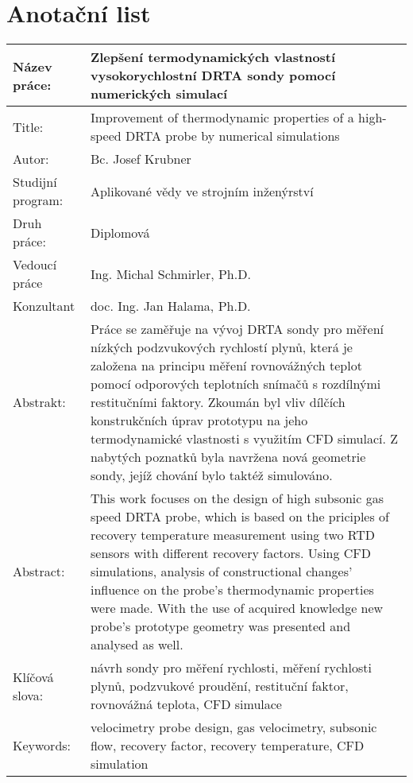 \thispagestyle{empty}
\section*{Anotační list}
\def\arraystretch{2}%
\begin{table}[ht!]
    \centering
    \begin{tabular}{p{}|p{}}
    Název práce: & Zlepšení termodynamických vlastností vysokorychlostní DRTA sondy pomocí numerických simulací \\ \hline
    Title: & Improvement of thermodynamic properties of a high-speed DRTA probe by numerical simulations \\ \hline
    Autor: & Bc. Josef Krubner \\ \hline
    Studijní program: & Aplikované vědy ve strojním inženýrství \\ \hline
    Druh práce: & Diplomová \\ \hline
    Vedoucí práce & Ing. Michal Schmirler, Ph.D. \\ \hline
    Konzultant & doc. Ing. Jan Halama, Ph.D. \\ \hline
    Abstrakt: & Práce se zaměřuje na vývoj DRTA sondy pro měření nízkých podzvukových rychlostí plynů, která je založena na principu měření rovnovážných teplot pomocí odporových teplotních snímačů s rozdílnými restitučními faktory. Zkoumán byl vliv dílčích konstrukčních úprav prototypu na jeho termodynamické vlastnosti s využitím CFD simulací. Z nabytých poznatků byla navržena nová geometrie sondy, jejíž chování bylo taktéž simulováno. \\ \hline
    Abstract: & This work focuses on the design of high subsonic gas speed DRTA probe, which is based on the priciples of recovery temperature measurement using two RTD sensors with different recovery factors. Using CFD simulations, analysis of constructional changes' influence on the probe's thermodynamic properties were made. With the use of acquired knowledge new probe's prototype geometry was presented and analysed as well.  \\ \hline
    Klíčová slova: & návrh sondy pro měření rychlosti, měření rychlosti plynů, podzvukové proudění, restituční faktor, rovnovážná teplota, CFD simulace\\ \hline
    Keywords: & velocimetry probe design, gas velocimetry, subsonic flow, recovery factor, recovery temperature, CFD simulation
    \end{tabular}
\end{table}
\def\arraystretch{1}%